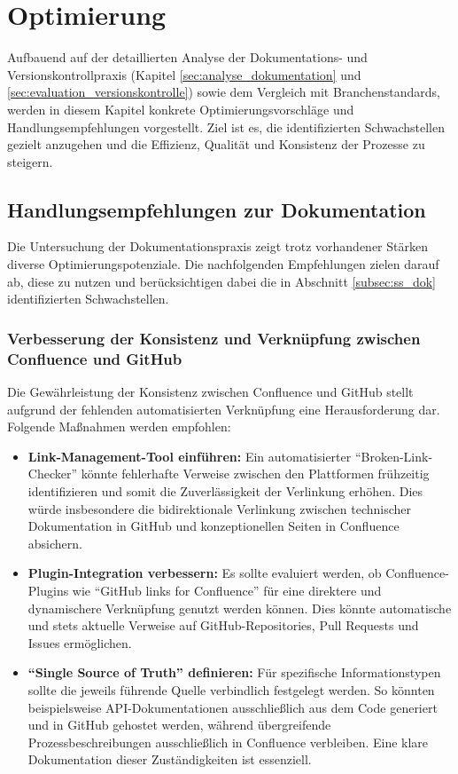 \documentclass[12pt,oneside]{article}
\begin{document}


    \section{Optimierung}
    \label{sec:optimierung}
    Aufbauend auf der detaillierten Analyse der Dokumentations- und Versionskontrollpraxis (Kapitel \ref{sec:analyse_dokumentation} und \ref{sec:evaluation_versionskontrolle}) sowie dem Vergleich mit Branchenstandards, werden in diesem Kapitel konkrete Optimierungsvorschläge und Handlungsempfehlungen vorgestellt. Ziel ist es, die identifizierten Schwachstellen gezielt anzugehen und die Effizienz, Qualität und Konsistenz der Prozesse zu steigern.

    \subsection{Handlungsempfehlungen zur Dokumentation}
    \label{subsec:empfehlungen_dok}
    Die Untersuchung der Dokumentationspraxis zeigt trotz vorhandener Stärken diverse Optimierungspotenziale. Die nachfolgenden Empfehlungen zielen darauf ab, diese zu nutzen und berücksichtigen dabei die in Abschnitt \ref{subsec:ss_dok} identifizierten Schwachstellen.

    \subsubsection{Verbesserung der Konsistenz und Verknüpfung zwischen Confluence und GitHub}
    \label{subsubsec:doku_konsistenz_verknuepfung}
    Die Gewährleistung der Konsistenz zwischen Confluence und GitHub stellt aufgrund der fehlenden automatisierten Verknüpfung eine Herausforderung dar. Folgende Maßnahmen werden empfohlen:
    \begin{itemize}
        \item \textbf{Link-Management-Tool einführen:} Ein automatisierter ``Broken-Link-Checker'' könnte fehlerhafte Verweise zwischen den Plattformen frühzeitig identifizieren und somit die Zuverlässigkeit der Verlinkung erhöhen. Dies würde insbesondere die bidirektionale Verlinkung zwischen technischer Dokumentation in GitHub und konzeptionellen Seiten in Confluence absichern.
        \item \textbf{Plugin-Integration verbessern:} Es sollte evaluiert werden, ob Confluence-Plugins wie ``GitHub links for Confluence'' \cite{GitHubLinksForConfluenceMarketplace} für eine direktere und dynamischere Verknüpfung genutzt werden können. Dies könnte automatische und stets aktuelle Verweise auf GitHub-Repositories, Pull Requests und Issues ermöglichen.
        \item \textbf{``Single Source of Truth'' definieren:} Für spezifische Informationstypen sollte die jeweils führende Quelle verbindlich festgelegt werden. So könnten beispielsweise API-Dokumentationen ausschließlich aus dem Code generiert und in GitHub gehostet werden, während übergreifende Prozessbeschreibungen ausschließlich in Confluence verbleiben. Eine klare Dokumentation dieser Zuständigkeiten ist essenziell.
    \end{itemize}
\end{document}
